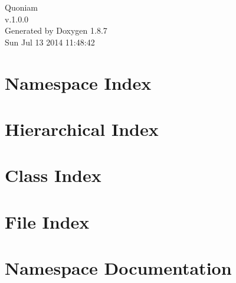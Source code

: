 \documentclass[twoside]{book}
\newcommand{\+}{\discretionary{\mbox{\scriptsize$\hookleftarrow$}}{}{}}
\newcommand{\clearemptydoublepage}{%
  \newpage{\pagestyle{empty}\cleardoublepage}%
}
\begin{document}
\hypersetup{pageanchor=false,
             bookmarks=true,
             bookmarksnumbered=true,
             pdfencoding=unicode
            }
\begin{titlepage}
\vspace*{7cm}
\begin{center}%
{\Large Quoniam \\[1ex]\large v.\+1.\+0.\+0 }\\
\vspace*{1cm}
{\large Generated by Doxygen 1.8.7}\\
\vspace*{0.5cm}
{\small Sun Jul 13 2014 11:48:42}\\
\end{center}
\end{titlepage}
\clearemptydoublepage
\tableofcontents
\clearemptydoublepage
{}
\hypersetup{pageanchor=true}

\chapter{Namespace Index}

\chapter{Hierarchical Index}

\chapter{Class Index}

\chapter{File Index}

\chapter{Namespace Documentation}

\end{document}
